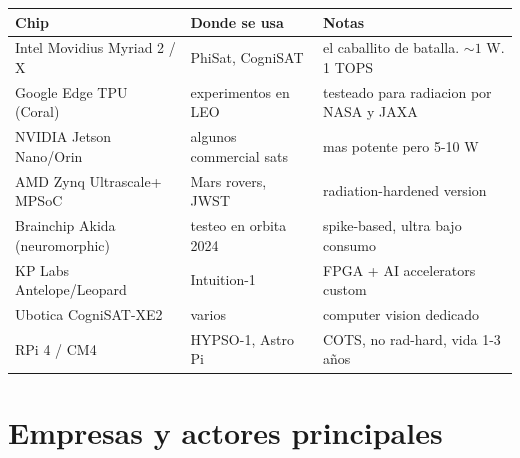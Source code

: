 \documentclass[11pt,a4paper,oneside]{report}
\begin{document}
\begin{longtable}{p{4.5cm}p{4cm}p{6cm}}
\toprule
\textbf{Chip} & \textbf{Donde se usa} & \textbf{Notas} \\
\midrule
\endhead
Intel Movidius Myriad 2 / X    & PhiSat, CogniSAT       & el caballito de batalla. $\sim 1$ W. 1 TOPS \\
Google Edge TPU (Coral)        & experimentos en LEO    & testeado para radiacion por NASA y JAXA \\
NVIDIA Jetson Nano/Orin        & algunos commercial sats & mas potente pero 5-10 W \\
AMD Zynq Ultrascale+ MPSoC     & Mars rovers, JWST      & radiation-hardened version \\
Brainchip Akida (neuromorphic) & testeo en orbita 2024  & spike-based, ultra bajo consumo \\
KP Labs Antelope/Leopard       & Intuition-1            & FPGA + AI accelerators custom \\
Ubotica CogniSAT-XE2           & varios                 & computer vision dedicado \\
RPi 4 / CM4                    & HYPSO-1, Astro Pi      & COTS, no rad-hard, vida 1-3 años \\
\bottomrule
\end{longtable}

\chapter{Empresas y actores principales}
\end{document}
